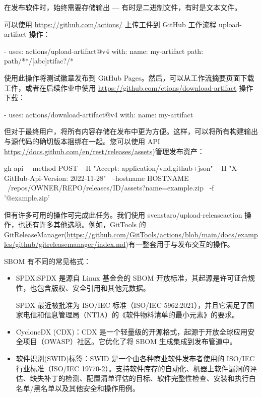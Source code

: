 
在发布软件时，始终需要存储输出 --- 有时是二进制文件，有时是文本文件。

可以使用 \url{https://github.com/actions/} 上传工件到 GitHub 工作流程 upload-artifact 操作：

\begin{shell}
- uses: actions/upload-artifact@v4
  with:
    name: my-artifact
    path: path/**/[abc]rtifac?/*
\end{shell}

使用此操作将测试徽章发布到 GitHub Pages。然后，可以从工作流摘要页面下载工件，或者在后续作业中使用 \url{https://github.com/ctions/download-artifact} 操作下载：

\begin{shell}
- uses: actions/download-artifact@v4
  with:
    name: my-artifact
\end{shell}

但对于最终用户，将所有内容存储在发布中更为方便。这样，可以将所有构建输出与源代码的确切版本捆绑在一起。您可以使用 API \url{https://docs.github.com/en/rest/releases/assets})管理发布资产：

\begin{shell}
gh api \
  --method POST \
  -H "Accept: application/vnd.github+json" \
  -H "X-GitHub-Api-Version: 2022-11-28" \
  --hostname HOSTNAME \
  /repos/OWNER/REPO/releases/ID/assets?name=example.zip \
  -f '@example.zip'
\end{shell}

但有许多可用的操作可完成此任务。我们使用 svenstaro/upload-releaseaction 操作，也还有许多其他选项。例如，GitTools 的 GitReleaseManager(\url{https://github.com/GitTools/actions/blob/main/docs/examples/github/gitreleasemanager/index.md})有一整套用于与发布交互的操作。

\mySubsubsection{6.8.4}{There’s more…}

SBOM 有不同的常见格式：

\begin{itemize}
\item 
SPDX:SPDX 是源自 Linux 基金会的 SBOM 开放标准，其起源是许可证合规性，也包含版权、安全引用和其他元数据。

SPDX 最近被批准为 ISO/IEC 标准（ISO/IEC 5962:2021），并且它满足了国家电信和信息管理局（NTIA）的《软件物料清单的最小元素》的要求。

\item 
CycloneDX (CDX)：CDX 是一个轻量级的开源格式，起源于开放全球应用安全项目（OWASP）社区。它优化了将 SBOM 生成集成到发布管道中。

\item 
软件识别(SWID)标签：SWID 是一个由各种商业软件发布者使用的 ISO/IEC 行业标准（ISO/IEC 19770-2）。支持软件库存的自动化、机器上软件漏洞的评估、缺失补丁的检测、配置清单评估的目标、软件完整性检查、安装和执行白名单/黑名单以及其他安全和操作用例。
\end{itemize}


